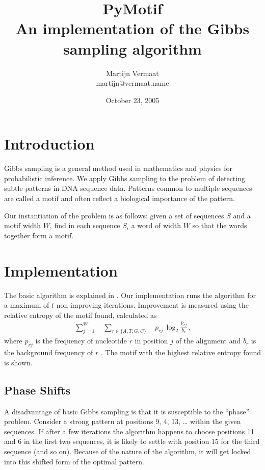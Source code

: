 \documentclass[a4paper,11pt]{article}
\title{PyMotif\\
\normalsize{An implementation of the Gibbs sampling algorithm}}
\author{
    Martijn Vermaat\\
    martijn@vermaat.name
}
\date{October 23, 2005}
\begin{document}
\maketitle


\section{Introduction}

Gibbs sampling is a general method used in mathematics and physics for
probabilistic inference. We apply Gibbs sampling to the problem of detecting
subtle patterns in DNA sequence data. Patterns common to multiple sequences
are called a motif and often reflect a biological importance of the pattern.

Our instantiation of the problem is as follows: given a set of sequences $S$
and a motif width $W$, find in each sequence $S_{i}$ a word of width $W$ so
that the words together form a motif.


\section{Implementation}

The basic algorithm is explained in \cite{Lawrence93}. Our implementation runs
the algorithm for a maximum of $t$ non-improving iterations. Improvement is
measured using the relative entropy of the motif found, calculated as
\begin{align*}
\sum_{j=1}^{W} \quad \sum_{r \in \{A,T,G,C\}} \quad p_{r j} \, \log_{2}
\frac{p_{r j}}{b_{r}} \, \text{,}
\end{align*}
where $p_{r j}$ is the frequency of nucleotide $r$ in position $j$ of the
alignment and $b_{r}$ is the background frequency of $r$ \cite{Jones04}. The
motif with the highest relative entropy found is shown.


\subsection*{Phase Shifts}

A disadvantage of basic Gibbs sampling is that it is susceptible to the
``phase'' problem. Consider a strong pattern at positions 9, 4, 13, \ldots
within the given sequences. If after a few iterations the algorithm happens to
choose positions 11 and 6 in the first two sequences, it is likely to settle
with position 15 for the third sequence (and so on). Because of the nature of
the algorithm, it will get locked into this shifted form of the optimal
pattern.
\end{document}
